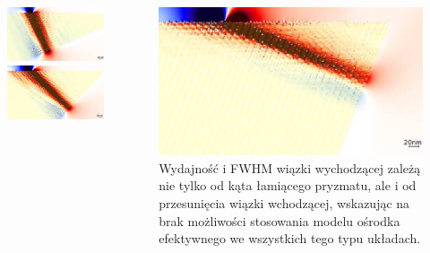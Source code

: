 \documentclass{beamer}
\begin{document}
\begin{frame}[t]
	\begin{columns}
		\begin{column}{0.5\textwidth}
			\begin{figure}
				\includegraphics[width=\textwidth]{../images/multilayer/prism04.png} \\
				\includegraphics[width=\textwidth]{../images/multilayer/prism08.png} \\
			\end{figure}
		\end{column}
		\begin{column}{0.5\textwidth}
				\includegraphics[width=\textwidth]{../images/multilayer/prism12.png}\\
				Wydajność i FWHM wiązki wychodzącej zależą nie tylko od kąta łamiącego pryzmatu, ale i od przesunięcia wiązki wchodzącej, wskazując na brak możliwości stosowania modelu ośrodka efektywnego we wszystkich tego typu układach.
	

\end{column}
\end{columns}
\end{frame}
\end{document}
